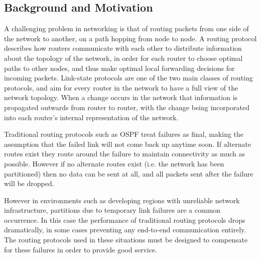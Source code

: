 \documentclass[10pt,twoside,a4paper]{article}
\begin{document}



\subsection{Background and Motivation}

A challenging problem in networking is that of routing packets from one side of the network to another, on a path hopping from node to node. A routing protocol describes how routers communicate with each other to distribute information about the topology of the network, in order for each router to choose optimal paths to other nodes, and thus make optimal local forwarding decisions for incoming packets. Link-state protocols are one of the two main classes of routing protocols, and aim for every router in the network to have a full view of the network topology. When a change occurs in the network that information is propagated outwards from router to router, with the change being incorporated into each router's internal representation of the network.

Traditional routing protocols such as OSPF treat failures as final, making the assumption that the failed link will not come back up anytime soon. If alternate routes exist they route around the failure to maintain connectivity as much as possible. However if no alternate routes exist (i.e. the network has been partitioned) then no data can be sent at all, and all packets sent after the failure will be dropped.



However in environments such as developing regions with unreliable network infrastructure, partitions due to temporary link failures are a common occurrence. In this case the performance of traditional routing protocols drops dramatically, in some cases preventing any end-to-end communication entirely. The routing protocols used in these situations must be designed to compensate for these failures in order to provide good service.
\end{document}
